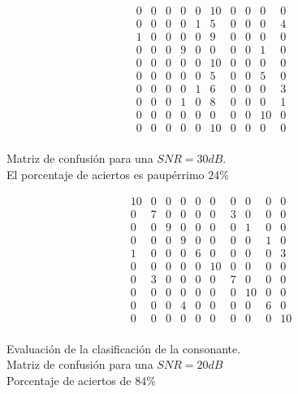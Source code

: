 \documentclass[conference,a4paper,10pt,oneside,final]{tfmpd}
\begin{document}
	\begin{table}
	\[
		\begin{array}{cccccccccc}
0 & 0 & 0 & 0 & 0 & 10 & 0 & 0 & 0 & 0 \\
0 & 0 & 0 & 0 & 1 & 5 & 0 & 0 & 0 & 4 \\
1 & 0 & 0 & 0 & 0 & 9 & 0 & 0 & 0 & 0 \\
0 & 0 & 0 & 9 & 0 & 0 & 0 & 0 & 1 & 0 \\
0 & 0 & 0 & 0 & 0 & 10 & 0 & 0 & 0 & 0 \\
0 & 0 & 0 & 0 & 0 & 5 & 0 & 0 & 5 & 0 \\
0 & 0 & 0 & 0 & 1 & 6 & 0 & 0 & 0 & 3 \\
0 & 0 & 0 & 1 & 0 & 8 & 0 & 0 & 0 & 1 \\
0 & 0 & 0 & 0 & 0 & 0 & 0 & 0 & 10 & 0 \\
0 & 0 & 0 & 0 & 0 & 10 & 0 & 0 & 0 & 0 \\
		\end{array}
	\]
		\caption{Matriz de confusión para una $SNR=30dB$. \\
		El porcentaje de aciertos es paupérrimo $24\%$}
	\end{table}

	\begin{table}
	\[
		\begin{array}{cccccccccc}
10 & 0 & 0 & 0 & 0 & 0 & 0 & 0 & 0 & 0 \\
0 & 7 & 0 & 0 & 0 & 0 & 3 & 0 & 0 & 0 \\
0 & 0 & 9 & 0 & 0 & 0 & 0 & 1 & 0 & 0 \\
0 & 0 & 0 & 9 & 0 & 0 & 0 & 0 & 1 & 0 \\
1 & 0 & 0 & 0 & 6 & 0 & 0 & 0 & 0 & 3 \\
0 & 0 & 0 & 0 & 0 & 10 & 0 & 0 & 0 & 0 \\
0 & 3 & 0 & 0 & 0 & 0 & 7 & 0 & 0 & 0 \\
0 & 0 & 0 & 0 & 0 & 0 & 0 & 10 & 0 & 0 \\
0 & 0 & 0 & 4 & 0 & 0 & 0 & 0 & 6 & 0 \\
0 & 0 & 0 & 0 & 0 & 0 & 0 & 0 & 0 & 10 \\
		\end{array}
	\]
		\caption{Evaluación de la clasificación de la consonante. \\
		Matriz de confusión para una $SNR=20dB$ \\
		Porcentaje de aciertos de $84\%$}
	\end{table}
	
\end{document}

